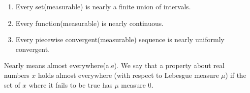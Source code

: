 \documentclass[	DIV=calc,paper=a4,fontsize=11pt]{scrartcl}	 	%
\theoremstyle{definition}
\theoremstyle{plain}
\theoremstyle{remark}
\begin{document}
\begin{tcolorbox}[colback=red!5!white,colframe=red!75!black,title=\textbf{Littlewood's Three Principles}]
\begin{enumerate}
  \item Every set(measurable) is nearly a finite union of intervals.
  \item Every function(measurable) is nearly continuous.
  \item Every piecewise convergent(measurable) sequence is nearly uniformly convergent.
\end{enumerate}
\tcblower
Nearly means almost everywhere(a.e). We say that a property about real numbers $x$ holds almost everywhere (with respect to Lebesgue measure $\mu$) if the set of $x$ where it fails to be true has $\mu$ measure $0$.
\end{tcolorbox}
\end{document}
